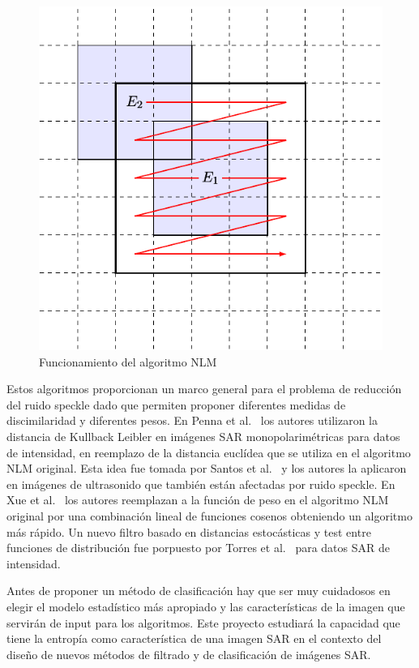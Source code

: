 \documentclass[11pt]{article}
\begin{document}
\begin{figure}[hbt]
	\label{NLM}
	\centering
	\includegraphics[scale=0.6]{../../Figures/Proyectos/UNGS2020/filtros.pdf}
	\caption{Funcionamiento del algoritmo NLM}
\end{figure}

Estos algoritmos proporcionan un marco general para el problema de reducción del ruido speckle dado que permiten proponer diferentes medidas de discimilaridad y diferentes pesos. En Penna et al.~\cite{Penna2013} los autores utilizaron la distancia de Kullback Leibler en imágenes SAR monopolarimétricas para datos de intensidad, en reemplazo de la distancia euclídea que se utiliza en el algoritmo NLM original. Esta idea fue tomada por Santos et al.~\cite{Santos2017} y los autores la aplicaron en imágenes de ultrasonido que también están afectadas por ruido speckle. En Xue et al.~\cite{Xue2013} los autores reemplazan a la función de peso en el algoritmo NLM original por una combinación lineal de funciones cosenos obteniendo un algoritmo más rápido. Un nuevo filtro basado en distancias estocásticas y test entre funciones de distribución fue porpuesto por Torres et al.~\cite{Torres2012} para datos SAR de intensidad.

Antes de proponer un método de clasificación hay que ser muy cuidadosos en elegir el modelo estadístico más apropiado y las características de la imagen que servirán de input para los algoritmos. Este proyecto estudiará la capacidad que tiene la entropía como característica de una imagen SAR en el contexto del diseño de nuevos métodos de filtrado y de clasificación de imágenes SAR.
\end{document}
